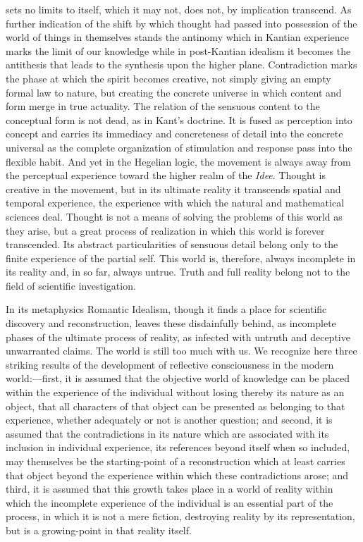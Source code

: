 \documentclass[12pt]{article}
\begin{document}
sets no limits to itself, which it may not, does not, by
implication transcend. As further indication of the
shift by which thought had passed into possession of
the world of things in themselves stands the antinomy
which in Kantian experience marks the limit of our
knowledge while in post-Kantian idealism it becomes
the antithesis that leads to the synthesis upon the
higher plane. Contradiction marks the phase at which
the spirit becomes creative, not simply giving an empty
formal law to nature, but creating the concrete universe
in which content and form merge in true actuality.
The relation of the sensuous content to the
conceptual form is not dead, as in Kant's doctrine. It
is fused as perception into concept and carries its
immediacy and concreteness of detail into the concrete
universal as the complete organization of stimulation
and response pass into the flexible habit. And yet
in the Hegelian logic, the movement is always away
from the perceptual experience toward the higher realm
of the \emph{Idee}. Thought is creative in the movement, but
in its ultimate reality it transcends spatial and temporal
experience, the experience with which the natural
and mathematical sciences deal. Thought is not a
means of solving the problems of this world as they
arise, but a great process of realization in which this
world is forever transcended. Its abstract particularities
of sensuous detail belong only to the finite experience
of the partial self. This world is, therefore,
always incomplete in its reality and, in so far, always
untrue. Truth and full reality belong not to the field
of scientific investigation.


In its metaphysics Romantic Idealism, though it
finds a place for scientific discovery and reconstruction,
leaves these disdainfully behind, as incomplete phases
of the ultimate process of reality, as infected with untruth
and deceptive unwarranted claims. The world is
still too much with us. We recognize here three striking
results of the development of reflective consciousness
in the modern world:—first, it is assumed that the
objective world of knowledge can be placed within
the experience of the individual without losing thereby
its nature as an object, that all characters of that
object can be presented as belonging to that experience,
whether adequately or not is another question;
and second, it is assumed that the contradictions in
its nature which are associated with its inclusion in
individual experience, its references beyond itself when
so included, may themselves be the starting-point of
a reconstruction which at least carries that object
beyond the experience within which these contradictions
arose; and third, it is assumed that this growth
takes place in a world of reality within which the
incomplete experience of the individual is an essential
part of the process, in which it is not a mere fiction,
destroying reality by its representation, but is a growing-point
in that reality itself.
\end{document}

